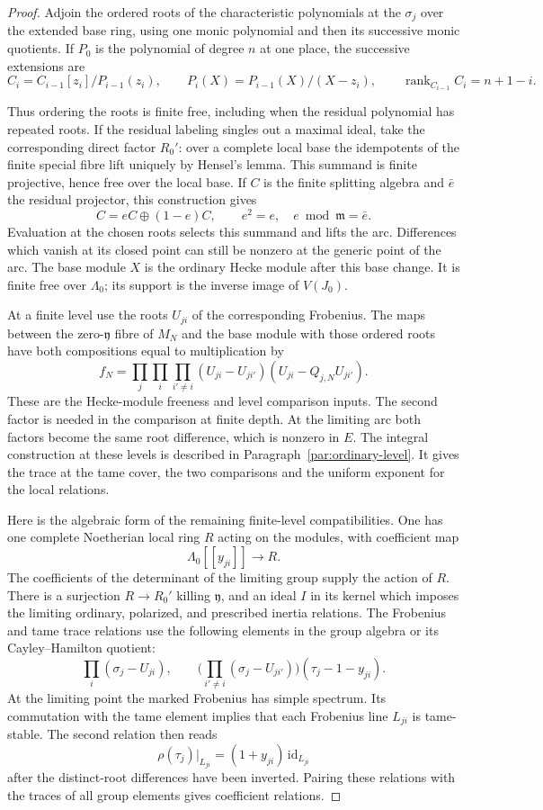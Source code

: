 \begin{proof}
Adjoin the ordered roots of the characteristic polynomials at
the \(\sigma_j\) over the extended base ring, using one monic
polynomial and then its successive monic quotients. If \(P_0\) is the polynomial of degree \(n\) at one place, the successive extensions are
\[
 C_i=C_{i-1}[z_i]/P_{i-1}(z_i),\qquad
 P_i(X)=P_{i-1}(X)/(X-z_i),\qquad
 \operatorname{rank}_{C_{i-1}} C_i=n+1-i .
\]

Thus ordering the roots is finite free, including when the residual
polynomial has repeated roots. If the residual labeling singles out a
maximal ideal, take the corresponding direct factor \(R_0'\):
over a complete local base the idempotents of the finite special
fibre lift uniquely by Hensel's lemma. This summand is finite
projective, hence free over the local base. If \(C\) is the
finite splitting algebra and \(\bar e\) the residual projector, this
construction gives
\[
             C=eC\oplus(1-e)C,\qquad e^2=e,\quad e\bmod\mathfrak m=\bar e .
\]
Evaluation at the
chosen roots selects this summand and lifts the arc. Differences
which vanish at its closed point can still be nonzero at the
generic point of the arc. The base module \(X\) is the ordinary
Hecke module after this base change. It is finite free
over \(\Lambda_0\); its support is the inverse image of
\(V(J_0)\).

At a finite level use the roots \(U_{ji}\) of
the corresponding Frobenius. The maps between the
zero-\(\mathfrak y\) fibre of \(M_N\) and the base module
with those ordered roots have both compositions equal to
multiplication by
\[
 f_N=\prod_j\prod_{i}\prod_{i'\ne i}
 (U_{ji}-U_{ji'})(U_{ji}-Q_{j,N}U_{ji'}).
\]
These are the Hecke-module freeness and level comparison
inputs. The second factor is needed in the comparison
at finite depth. At the limiting arc both factors become
the same root difference, which is nonzero in \(E\).
The integral construction at these levels is described
in Paragraph~\ref{par:ordinary-level}. It gives the
trace at the tame cover, the two comparisons and the
uniform exponent for the local relations.

Here is the algebraic form of the remaining finite-level
compatibilities. One has one complete Noetherian local
ring \(R\) acting on the modules, with coefficient map
\[
 \Lambda_0[[y_{ji}]]\to R.
\]
The coefficients of the determinant of the limiting group supply the action of \(R\).
There is a surjection \(R\to R_0'\) killing \(\mathfrak y\),
and an ideal \(I\) in its kernel which imposes the limiting
ordinary, polarized, and prescribed inertia relations.
The Frobenius and tame trace relations use the following
elements in the group algebra or its Cayley--Hamilton quotient:
\[
       \prod_i(\sigma_j-U_{ji}),\qquad
       \Big(\prod_{i'\ne i}(\sigma_j-U_{ji'})\Big)
                       (\tau_j-1-y_{ji}).
\]
At the limiting point the marked Frobenius has simple spectrum. Its commutation with the tame element implies that each Frobenius line \(L_{ji}\) is tame-stable. The second relation then reads
\[
 \rho(\tau_j)|_{L_{ji}}=(1+y_{ji})\,\mathrm{id}_{L_{ji}}
\]
after the distinct-root differences have been inverted. Pairing these
relations with the traces of all group elements gives
coefficient relations.


\end{proof}
